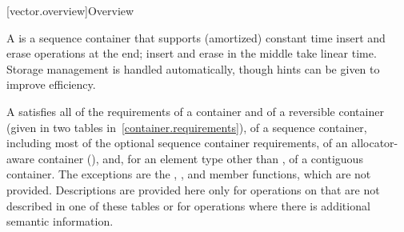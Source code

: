 [vector.overview]{Overview}

\pnum
{}%
A
is a sequence container that supports
(amortized) constant time insert and erase operations at the end;
insert and erase in the middle take linear time.
Storage management is handled automatically, though hints can be given
to improve efficiency.

\pnum
A  satisfies all of the requirements of a container and of a
reversible container (given in two tables in~\ref{container.requirements}), of a
sequence container, including most of the optional sequence container
requirements, of an allocator-aware container
(),
and, for an element type other than ,
of a contiguous container.
The exceptions are the
, , and  member functions, which are not
provided. Descriptions are provided here only for operations on 
that are not described in one of these tables or for operations where there is
additional semantic information.

